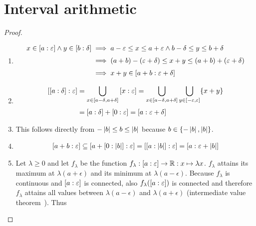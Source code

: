 \section{Interval arithmetic}



\begin{proof} ~
  \begin{enumerate}
    \item

      \begin{align}
        x \in \an[\epsilon]{a} \land y \in \an[\delta]{b} & \implies a-\epsilon \le x \le a+\epsilon \land b-\delta \le y \le b+\delta \nl
        & \implies (a+b)-(\epsilon + \delta) \le x+y \le (a+b)+(\epsilon + \delta) \nl
        & \implies x+y \in \an[\epsilon+\delta]{a+b}
      \end{align}

    \item

      \begin{align}
        \an[\epsilon]{\an[\delta]{a}} & = \bigcup_{x\in \interval{a-\delta}{a+\delta}} \an[\epsilon]{x} = \bigcup_{x\in\interval{a-\delta}{a+\delta}} \bigcup_{y\in\interval{-\epsilon}{\epsilon}} \{x+y\} \nl
        &= \an[\delta]{a} + \an[\epsilon]{0} = \an[\epsilon+\delta]{a}
      \end{align}
 
    \item

      This follows directly from $-\abs{b} \le b \le \abs{b}$ because $b \in \{-\abs{b}, \abs{b}\}$.

    \item

      \begin{align}
        \an[\epsilon]{a+b} \subseteq \an[\epsilon]{a+\an[\abs{b}]{0}} = \an[\epsilon]{\an[\abs{b}]{a}} = \an[\epsilon+\abs{b}]{a}
      \end{align}

    \item
      Let $\lambda \ge 0$ and let $f_\lambda$ be the function $f_\lambda : \an[\epsilon]{a}\to\R:x\mapsto \lambda x$. $f_\lambda$ attains its maximum at $\lambda(a+\epsilon)$ and its minimum at $\lambda(a-\epsilon)$. Because $f_\lambda$ is continuous and $\an[\epsilon]{a}$ is connected, also $f_\lambda(\an[\epsilon]{a})$ is connected and therefore $f_\lambda$ attains all values between $\lambda(a-\epsilon)$ and $\lambda(a+\epsilon)$ (intermediate value theorem~\cite{wiki:intermediatevaluetheorem}). Thus


\end{enumerate}
\end{proof}
